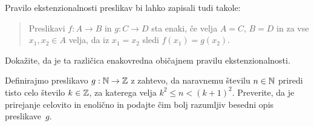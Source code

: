 \begin{vaja}
  Pravilo ekstenzionalnosti preslikav bi lahko zapisali tudi takole:
  \begin{quote}
    Preslikavi $f : A \to B$ in $g : C \to D$ sta enaki, če velja $A = C$, $B = D$ in za
    vse $x_1, x_2 \in A$ velja, da iz $x_1 = x_2$ sledi $f(x_1) = g(x_2)$.
  \end{quote}
  Dokažite, da je ta različica enakovredna običajnem pravilu ekstenzionalnosti.
\end{vaja}

\begin{vaja}
 Definirajmo preslikavo $g : \mathbb{N} \to \mathbb{Z}$ z zahtevo, da naravnemu številu $n \in \mathbb{N}$ priredi tisto celo število $k \in \mathbb{Z}$, za katerega velja $k^2 \leq n < (k+1)^2$.
 Preverite, da je prirejanje celovito in enolično in podajte čim bolj razumljiv besedni opis preslikave~$g$.
\end{vaja}
